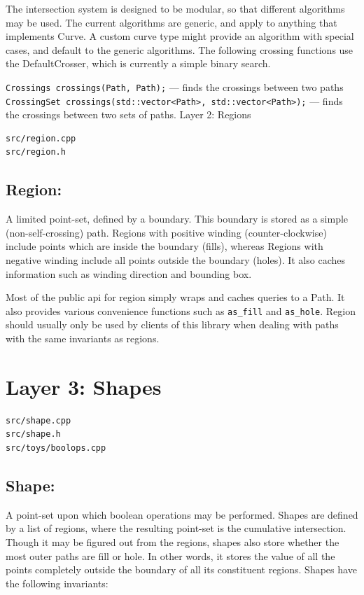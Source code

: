 \documentclass[openany]{book}
\begin{document}
The intersection system is designed to be modular, so that different algorithms may be used. The current algorithms are generic, and apply to anything that implements Curve. A custom curve type might provide an algorithm with special cases, and default to the generic algorithms. The following crossing functions use the DefaultCrosser, which is currently a simple binary search.

\verb|Crossings crossings(Path, Path);|  —  finds the crossings between two paths
\verb|CrossingSet crossings(std::vector<Path>, std::vector<Path>);|  —  finds the crossings between two sets of paths.
Layer 2: Regions

\begin{verbatim}
src/region.cpp
src/region.h
\end{verbatim}

\subsection{Region:}
A limited point-set, defined by a boundary. This boundary is stored as a simple (non-self-crossing) path. Regions with positive winding (counter-clockwise) include points which are inside the boundary (fills), whereas Regions with negative winding include all points outside the boundary (holes). It also caches information such as winding direction and bounding box.

Most of the public api for region simply wraps and caches queries to a Path. It also provides various convenience functions such as \verb|as_fill| and \verb|as_hole|. Region should usually only be used by clients of this library when dealing with paths with the same invariants as regions.
\section{Layer 3: Shapes}

\begin{verbatim}
src/shape.cpp
src/shape.h
src/toys/boolops.cpp
\end{verbatim}

\subsection{Shape:}
A point-set upon which boolean operations may be performed. Shapes are defined by a list of regions, where the resulting point-set is the cumulative intersection. Though it may be figured out from the regions, shapes also store whether the most outer paths are fill or hole. In other words, it stores the value of all the points completely outside the boundary of all its constituent regions. Shapes have the following invariants:
\end{document}
